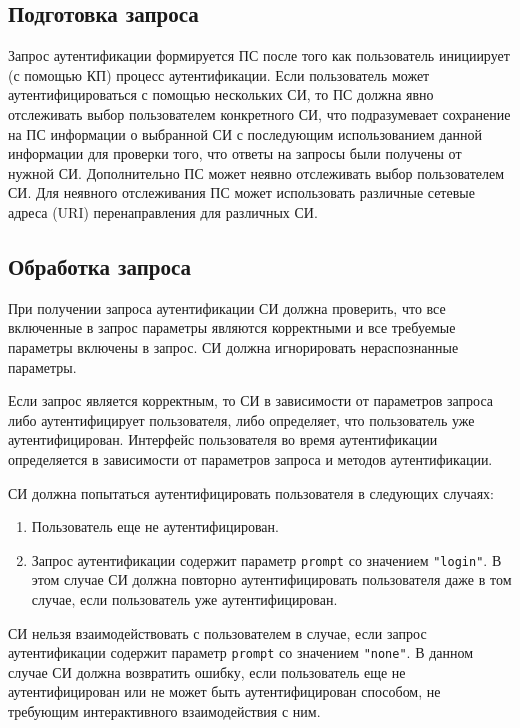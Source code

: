 \label{REQRESP.Auth}

\subsection{Подготовка запроса}\label{REQRESP.Auth.Pre}

Запрос аутентификации формируется ПС после того как пользователь
инициирует (с помощью КП) процесс аутентификации.
%
Если пользователь может аутентифицироваться с помощью нескольких СИ,
то ПС должна явно отслеживать выбор пользователем конкретного СИ, 
что подразумевает сохранение на ПС информации о выбранной СИ с последующим 
использованием данной информации для проверки того, что ответы на запросы были 
получены от нужной СИ. Дополнительно ПС может неявно отслеживать выбор 
пользователем СИ. Для неявного отслеживания ПС может использовать различные 
сетевые адреса (URI) перенаправления для различных СИ.

\subsection{Обработка запроса}\label{REQRESP.Auth.Req} 

При получении запроса аутентификации СИ должна проверить, что все включенные в
запрос параметры являются корректными и все требуемые параметры включены в
запрос.
%
СИ должна игнорировать нераспознанные параметры.

Если запрос является корректным, то СИ в зависимости от параметров запроса 
либо аутентифицирует пользователя, либо определяет, что пользователь уже 
аутентифицирован. 
%
Интерфейс пользователя во время аутентификации определяется в зависимости 
от параметров запроса и методов аутентификации.

СИ должна попытаться аутентифицировать пользователя в следующих случаях:
\begin{enumerate} 
\item Пользователь еще не аутентифицирован.

\item Запрос аутентификации содержит параметр \lstinline{prompt} со 
значением \lstinline{"login"}. В этом случае СИ должна повторно 
аутентифицировать пользователя даже в том случае, если пользователь уже 
аутентифицирован. 
\end{enumerate} 

СИ нельзя взаимодействовать с пользователем в случае,
если запрос аутентификации содержит параметр \lstinline{prompt} со 
значением \lstinline{"none"}. В данном случае СИ должна возвратить ошибку,
если пользователь еще не аутентифицирован или не может быть аутентифицирован  
способом, не требующим интерактивного взаимодействия с ним.

